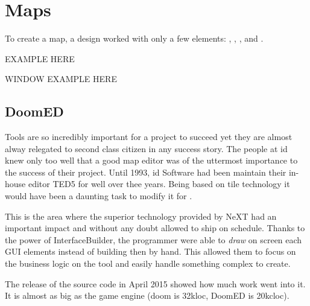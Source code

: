 

\section{Maps}
To create a map, a design worked with only a few elements: , , , and .\\
\par
EXAMPLE HERE\\
\par
\pagebreak


WINDOW EXAMPLE HERE\\
\par
\pagebreak



\subsection{DoomED}
Tools are so incredibly important for a project to succeed yet they are almost alway relegated to second class citizen in any success story. The people at id knew only too well that a good map editor was of the uttermost importance to the success of their project. Until 1993, id Software had been maintain their in-house editor TED5 for well over thee years. Being based on tile technology it would have been a daunting task to modify it for \doom.\\
\par
This is the area where the superior technology provided by NeXT had an important impact and without any doubt allowed \doom to ship on schedule. Thanks to the power of InterfaceBuilder, the programmer were able to \textit{draw} on screen each GUI elements instead of building then by hand. This allowed them to focus on the business logic on the tool and easily handle something complex to create.\\
\par
{}
\par

The release of the source code in April 2015 showed how much work went into it. It is almost as big as the game engine (doom is 32kloc, DoomED is 20kcloc).\\
\par
{}
\par
{}\\
\par
{}
\par


